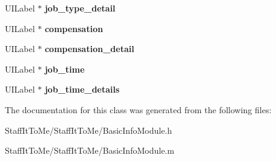 \begin{DoxyCompactItemize}
\item 
\hypertarget{interface_basic_info_module_ae2c5e1e2f7c3c7d1ec6e7c24a1915c0e}{
\-U\-I\-Label $\ast$ {\bfseries job\-\_\-type\-\_\-detail}}
\label{interface_basic_info_module_ae2c5e1e2f7c3c7d1ec6e7c24a1915c0e}

\item 
\hypertarget{interface_basic_info_module_a37b091340e77b9bc7c118f95fb048592}{
\-U\-I\-Label $\ast$ {\bfseries compensation}}
\label{interface_basic_info_module_a37b091340e77b9bc7c118f95fb048592}

\item 
\hypertarget{interface_basic_info_module_adcc6937461dc08424db153238c27269f}{
\-U\-I\-Label $\ast$ {\bfseries compensation\-\_\-detail}}
\label{interface_basic_info_module_adcc6937461dc08424db153238c27269f}

\item 
\hypertarget{interface_basic_info_module_a27f0545eca506d4160cc187bdf952bf2}{
\-U\-I\-Label $\ast$ {\bfseries job\-\_\-time}}
\label{interface_basic_info_module_a27f0545eca506d4160cc187bdf952bf2}

\item 
\hypertarget{interface_basic_info_module_a90a3402ac778bb4900b8d95c98288dbb}{
\-U\-I\-Label $\ast$ {\bfseries job\-\_\-time\-\_\-details}}
\label{interface_basic_info_module_a90a3402ac778bb4900b8d95c98288dbb}

\end{DoxyCompactItemize}


\-The documentation for this class was generated from the following files\-:\begin{DoxyCompactItemize}
\item 
\-Staff\-It\-To\-Me/\-Staff\-It\-To\-Me/\-Basic\-Info\-Module.\-h\item 
\-Staff\-It\-To\-Me/\-Staff\-It\-To\-Me/\-Basic\-Info\-Module.\-m\end{DoxyCompactItemize}
